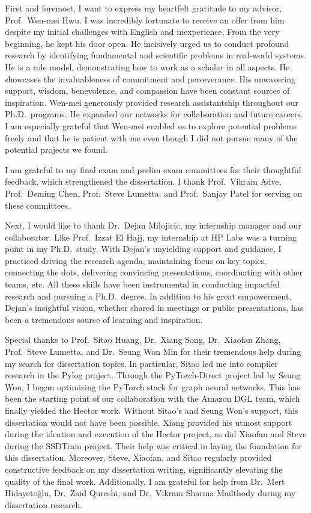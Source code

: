 
\begin{acknowledgments}

First and foremost, I want to express my heartfelt gratitude to my advisor, Prof.\ Wen-mei Hwu. I was incredibly fortunate to receive an offer from him despite my initial challenges with English and inexperience. From the very beginning, he kept his door open. He incisively urged us to conduct profound research by identifying fundamental and scientific problems in real-world systems. He is a role model, demonstrating how to work as a scholar in all aspects. He showcases the invaluableness of commitment and perseverance. His unwavering support, wisdom, benevolence, and compassion have been constant sources of inspiration. Wen-mei generously provided research assistantship throughout our Ph.D.\ programs. He expanded our networks for collaboration and future careers. I am especially grateful that Wen-mei enabled us to explore potential problems freely and that he is patient with me even though I did not pursue many of the potential projects we found.

I am grateful to my final exam and prelim exam committees for their thoughtful feedback, which strengthened the dissertation.
I thank Prof.~Vikram Adve, Prof.\ Deming Chen, Prof.\ Steve Lumetta, and Prof.\ Sanjay Patel for serving on these committees.

Next, I would like to thank Dr.\ Dejan Milojicic, my internship manager and our collaborator. Like Prof.\ Izzat El Hajj, my internship at HP Labs was a turning point in my Ph.D.\ study. With Dejan's unyielding support and guidance, I practiced driving the research agenda, maintaining focus on key topics, connecting the dots, delivering convincing presentations, coordinating with other teams, etc. All these skills have been instrumental in conducting impactful research and pursuing a Ph.D.\ degree. In addition to his great empowerment, Dejan's insightful vision, whether shared in meetings or public presentations, has been a tremendous source of learning and inspiration.

Special thanks to Prof.\ Sitao Huang, Dr.\ Xiang Song, Dr.\ Xiaofan Zhang, Prof.\ Steve Lumetta, and Dr.\ Seung Won Min for their tremendous help during my search for dissertation topics.
In particular, Sitao led me into compiler research in the Pylog project. Through the PyTorch-Direct project led by Seung Won, I began optimizing the PyTorch stack for graph neural networks. This has been the starting point of our collaboration with the Amazon DGL team, which finally yielded the Hector work.
Without Sitao's and Seung Won's support, this dissertation would not have been possible. 
Xiang provided his utmost support during the ideation and execution of the Hector project, as did Xiaofan and Steve during the SSDTrain project. Their help was critical in laying the foundation for this dissertation.
Moreover, Steve, Xiaofan, and Sitao regularly provided constructive feedback on my dissertation writing, significantly elevating the quality of the final work. Additionally, I am grateful for help from Dr.\ Mert Hidayeto\u{g}lu, Dr.\ Zaid Qureshi, and Dr.\ Vikram Sharma Mailthody during my dissertation research.


\end{acknowledgments}
